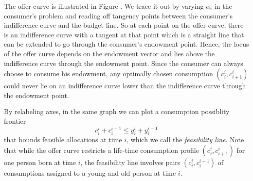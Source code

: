 The offer curve is illustrated in Figure . %
We trace it out by varying $\alpha_i$ in the consumer's problem and
reading off tangency points between the consumer's indifference
curve and the budget line.  
So at each point on the offer curve, there
is an indifference curve with a tangent at
that point which is a straight line that can
be extended to go through the consumer's 
endowment point.
Hence, the locus of the offer curve depends
on the endowment vector and  lies above the 
indifference curve through
the endowment point.  
Since the consumer can always choose to 
consume his endowment, any optimally
chosen consumption $(c_i^i, c^i_{i+1})$  could 
never lie on an indifference curve lower than 
the indifference curve through the endowment
point. 




By relabeling axes, in the same graph we can plot a consumption possiblity frontier
$$ c_i^i + c_i^{i-1} \leq y_i^i + y_i^{i-1} $$
that bounds feasible allocations at time $i$, which we
call the {\it feasibility line}.  Note that while the offer
curve restricts a life-time consumption
profile $(c_i^i, c_{i+1}^i)$ for one person born at time $i$, the feasibility line involves 
pairs $(c_i^i, c_i^{i-1})$ of consumptions assigned to a young and old person at time $i$.



